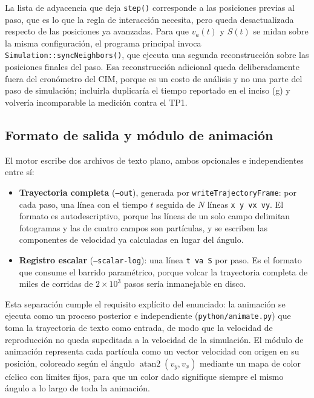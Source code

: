 \documentclass[11pt]{article}
\begin{document}
La lista de adyacencia que deja \texttt{step()} corresponde a las posiciones
previas al paso, que es lo que la regla de interacción necesita, pero queda
desactualizada respecto de las posiciones ya avanzadas. Para que $v_a(t)$ y
$S(t)$ se midan sobre la misma configuración, el programa principal invoca
\texttt{Simulation::syncNeighbors()}, que ejecuta una segunda reconstrucción
sobre las posiciones finales del paso. Esa reconstrucción adicional queda
deliberadamente fuera del cronómetro del CIM, porque es un costo de análisis y
no una parte del paso de simulación; incluirla duplicaría el tiempo reportado
en el inciso (g) y volvería incomparable la medición contra el TP1.

\subsection{Formato de salida y módulo de animación}
\label{sec:salida}

El motor escribe dos archivos de texto plano, ambos opcionales e independientes
entre sí:

\begin{itemize}
  \item \textbf{Trayectoria completa} (\texttt{--out}), generada por
    \texttt{writeTrajectoryFrame}: por cada paso, una línea con el tiempo $t$
    seguida de $N$ líneas \texttt{x y vx vy}. El formato es autodescriptivo,
    porque las líneas de un solo campo delimitan fotogramas y las de cuatro
    campos son partículas, y se escriben las componentes de velocidad ya
    calculadas en lugar del ángulo.
  \item \textbf{Registro escalar} (\texttt{--scalar-log}): una línea
    \texttt{t va S} por paso. Es el formato que consume el barrido paramétrico,
    porque volcar la trayectoria completa de miles de corridas de $2\times10^3$
    pasos sería inmanejable en disco.
\end{itemize}

Esta separación cumple el requisito explícito del enunciado: la animación se
ejecuta como un proceso posterior e independiente (\texttt{python/animate.py})
que toma la trayectoria de texto como entrada, de modo que la velocidad de
reproducción no queda supeditada a la velocidad de la simulación. El módulo de
animación representa cada partícula como un vector velocidad con origen en su
posición, coloreado según el ángulo $\operatorname{atan2}(v_y, v_x)$ mediante un
mapa de color cíclico con límites fijos, para que un color dado signifique
siempre el mismo ángulo a lo largo de toda la animación.
\end{document}
